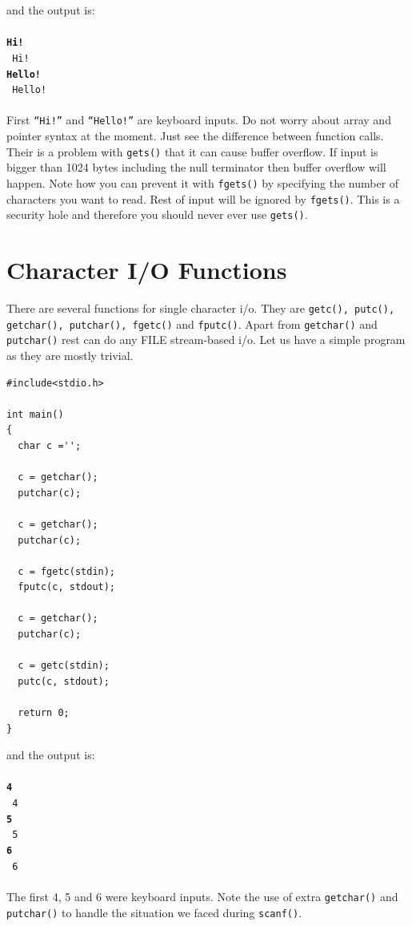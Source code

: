 and the output is:
\\\\\texttt{\textbf{Hi!\\}
Hi!\\
\textbf{Hello!\\}
Hello!\\\\}
First \texttt{``Hi!''} and \texttt{``Hello!''} are keyboard inputs. Do not
worry about array and pointer syntax at the moment. Just see the difference
between function calls. Their is a problem with \texttt{gets()} that it can
cause buffer overflow. If input is bigger than 1024 bytes including the null
terminator then buffer overflow will happen. Note how you can prevent it with
\texttt{fgets()} by specifying the number of characters you want to read. Rest
of input will be ignored by \texttt{fgets()}. This is a security hole and
therefore you should never ever use \texttt{gets()}.

\section{Character I/O Functions}
There are several functions for single character i/o. They are \texttt{getc(),
  putc(), getchar(), putchar(), fgetc()} and \texttt{fputc()}. Apart from
\texttt{getchar()} and \texttt{putchar()} rest can do any FILE stream-based
i/o. Let us have a simple program as they are mostly trivial.

\begin{verbatim}
#include<stdio.h>

int main()
{
  char c ='';

  c = getchar();
  putchar(c);

  c = getchar();
  putchar(c);

  c = fgetc(stdin);
  fputc(c, stdout);

  c = getchar();
  putchar(c);

  c = getc(stdin);
  putc(c, stdout);

  return 0;
}
\end{verbatim}

and the output is:
\\\\\texttt{\textbf{4\\}
4\\
\textbf{5\\}
5\\
\textbf{6\\}
6\\\\}
The first 4, 5 and 6 were keyboard inputs. Note the use of extra
\texttt{getchar()} and \texttt{putchar()} to handle the situation we faced
during \texttt{scanf()}.


